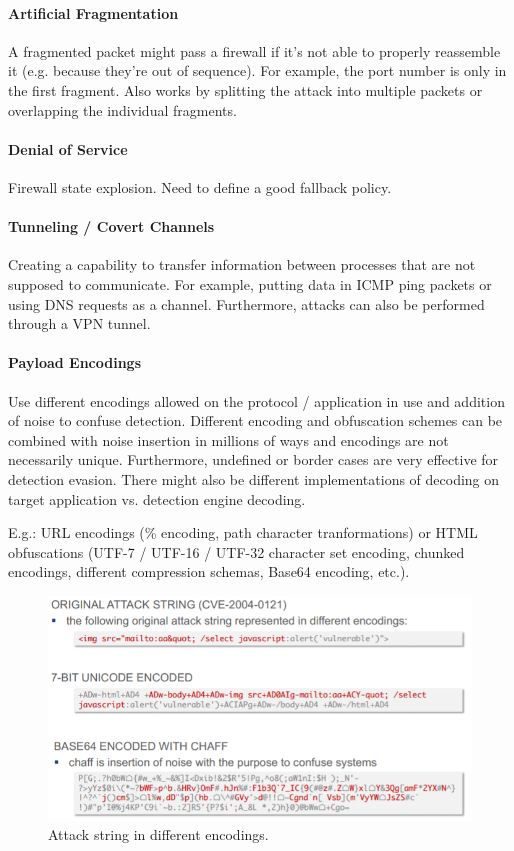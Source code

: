 \paragraph{Artificial Fragmentation}
A fragmented packet might pass a firewall if it's not able to properly reassemble it (e.g. because they're out of sequence). For example, the port number is only in the first fragment. Also works by splitting the attack into multiple packets or overlapping the individual fragments.

\paragraph{Denial of Service}
Firewall state explosion. Need to define a good fallback policy.

\paragraph{Tunneling / Covert Channels}
Creating a capability to transfer information between processes that are not supposed to communicate. For example, putting data in ICMP ping packets or using DNS requests as a channel. Furthermore, attacks can also be performed through a VPN tunnel.

\paragraph{Payload Encodings}
Use different encodings allowed on the protocol / application in use and addition of noise to confuse detection. Different encoding and obfuscation schemes can be combined with noise insertion in millions of ways and encodings are not necessarily unique. Furthermore, undefined or border cases are very effective for detection evasion. There might also be different implementations of decoding on target application vs. detection engine decoding.


E.g.: URL encodings (\% encoding, path character tranformations) or HTML obfuscations (UTF-7 / UTF-16 / UTF-32 character set encoding, chunked encodings, different compression schemas, Base64 encoding, etc.).

\begin{figure}[h]
	\centering
	\includegraphics[scale=0.8]{images/911-encodings.PNG}
	\caption{Attack string in different encodings.}
	\label{fig:encoding}
\end{figure}


